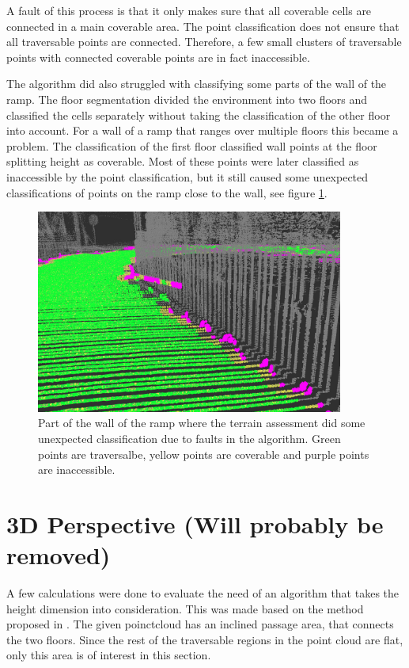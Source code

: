 A fault of this process is that it only makes sure that all coverable cells are connected in a main coverable area. The point classification does not ensure that all traversable points are connected. Therefore, a few small clusters of traversable points with connected coverable points are in fact inaccessible. 

The algorithm did also struggled with classifying some parts of the wall of the ramp. The floor segmentation divided the environment into two floors and classified the cells separately without taking the classification of the other floor into account. For a wall of a ramp that ranges over multiple floors this became a problem. The classification of the first floor classified wall points at the floor splitting height as coverable. Most of these points were later classified as inaccessible by the point classification, but it still caused some unexpected classifications of points on the ramp close to the wall, see figure \ref{fig:faulty_terrain_assessment}.

\begin{figure}
    \centering
    \includegraphics[width=0.9\textwidth]{figures/faulty_terrain_assessment.png}
    \caption{Part of the wall of the ramp where the terrain assessment did some unexpected classification due to faults in the algorithm. Green points are traversalbe, yellow points are coverable and purple points are inaccessible.}
    \label{fig:faulty_terrain_assessment}
\end{figure}


\section{3D Perspective (Will probably be removed)}
A few calculations were done to evaluate the need of an algorithm that takes the height dimension into consideration. This was made based on the method proposed in \cite{HAMEED201636}. The given poinctcloud has an inclined passage area, that connects the two floors. Since the rest of the traversable regions in the point cloud are flat, only this area is of interest in this section.

